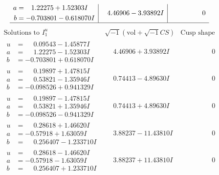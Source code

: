\documentclass[1p]{elsarticle_modified}
\theoremstyle{definition}
\newcommand{\I}{\sqrt{-1}}
\begin{document}
$$\begin{array}{c|c|c}
\begin{aligned}
a &= \phantom{-}1.22275 + 1.52303 I \\
b &= -0.703801 - 0.618070 I\end{aligned}
 & \phantom{-}4.46906 - 3.93892 I & \phantom{-0.000000 } 0\\
 \hline 
 \end{array}$$\newpage$$\begin{array}{c|c|c}  
\text{Solutions to }I^u_{1}& \I (\text{vol} + \sqrt{-1}CS) & \text{Cusp shape}\\
 \hline 
\begin{aligned}
u &= \phantom{-}0.09543 - 1.45877 I \\
a &= \phantom{-}1.22275 - 1.52303 I \\
b &= -0.703801 + 0.618070 I\end{aligned}
 & \phantom{-}4.46906 + 3.93892 I & \phantom{-0.000000 } 0 \\ \hline\begin{aligned}
u &= \phantom{-}0.19897 + 1.47815 I \\
a &= \phantom{-}0.53821 - 1.35946 I \\
b &= -0.098526 + 0.941329 I\end{aligned}
 & \phantom{-}0.74413 - 4.89630 I & \phantom{-0.000000 } 0 \\ \hline\begin{aligned}
u &= \phantom{-}0.19897 - 1.47815 I \\
a &= \phantom{-}0.53821 + 1.35946 I \\
b &= -0.098526 - 0.941329 I\end{aligned}
 & \phantom{-}0.74413 + 4.89630 I & \phantom{-0.000000 } 0 \\ \hline\begin{aligned}
u &= \phantom{-}0.28618 + 1.46620 I \\
a &= -0.57918 + 1.63059 I \\
b &= \phantom{-}0.256407 - 1.233710 I\end{aligned}
 & \phantom{-}3.88237 - 11.43810 I & \phantom{-0.000000 } 0 \\ \hline\begin{aligned}
u &= \phantom{-}0.28618 - 1.46620 I \\
a &= -0.57918 - 1.63059 I \\
b &= \phantom{-}0.256407 + 1.233710 I\end{aligned}
 & \phantom{-}3.88237 + 11.43810 I & \phantom{-0.000000 } 0 \\ \hline\begin{aligned}

\end{aligned}
\end{array}$$
\end{document}
